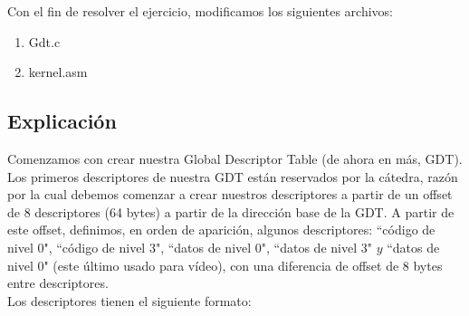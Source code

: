 \documentclass[a4paper]{article}
\begin{document}
Con el fin de resolver el ejercicio, modificamos los siguientes archivos:

\begin{enumerate}

\item Gdt.c
\item kernel.asm

\end{enumerate}

\subsection{Explicación}
Comenzamos con crear nuestra Global Descriptor Table (de ahora en más, GDT). Los primeros descriptores de nuestra GDT están reservados por la cátedra, razón por la cual debemos comenzar a crear nuestros descriptores a partir de un offset de 8 descriptores (64 bytes) a partir de la dirección base de la GDT. A partir de este offset, definimos, en orden de aparición, algunos descriptores: ``código de nivel 0", ``código de nivel 3", ``datos de nivel 0", ``datos de nivel 3" $y$ ``datos de nivel 0" (este último usado para vídeo), con una diferencia de offset de 8 bytes entre descriptores.\\

Los descriptores tienen el siguiente formato:
\end{document}
